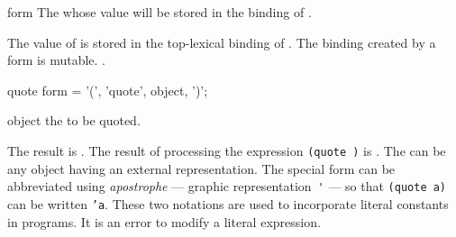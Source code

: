 \begin{optDefinition}
\begin{arguments}
    \item[form] The  whose value will be stored in the binding of
    .
\end{arguments}
%
\remarks%
The value of  is stored in the top-lexical binding of .
The binding created by a  form is mutable.
%
\seealso%
.

%
\Syntax
\savesyntax\quoteSyntax\vbox{\syntax
quote form
   = '(', 'quote', object, ')';
\endsyntax}
%
\begin{arguments}
    \item[object] the  to be quoted.
\end{arguments}
%
\result%
The result is .
%
\remarks%
The result of processing the expression {\tt (quote )} is
.  The  can be any object having an external
representation.  The special form
 can be abbreviated using {\em apostrophe} --- graphic
representation~\verb+'+ --- so that
{\tt (quote a)} can be written {\tt 'a}.  These two notations are used to
incorporate literal constants in programs.  It
is an error to modify a literal expression.
\end{optDefinition}

